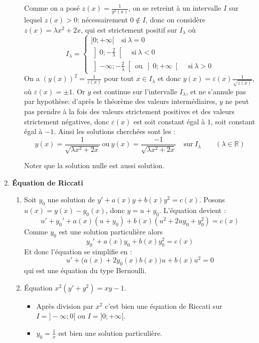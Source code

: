 \documentclass[11pt,a4paper]{article}
\newcommand{\Rr}{\mathbb{R}} \newcommand{\R}{\mathbb{R}}
\renewcommand{\epsilon}{\varepsilon}
\begin{document}
\begin{enumerate}
\begin{enumerate}
    Comme on a posé $z(x) = \frac{1}{y^2(x)}$, on se retreint à un intervalle $I$ sur lequel $z(x)>0$: nécessairement $0\notin I$, donc on considère $z(x)=\lambda x^2+2x$, qui est strictement positif sur $I_\lambda$ où
$$I_\lambda=\begin{cases}
]0;+\infty[\quad\text{si}\ \lambda=0\\
\left]0;-\frac{2}{\lambda}\right[\quad\text{si}\ \lambda<0\\
\left]-\infty;-\frac{2}{\lambda}\right[\ \mathrm{ou}\ \left]0;+\infty\right[\quad\text{si}\ \lambda>0              
            \end{cases}
$$
On a $(y(x))^2 = \frac{1}{z(x)}$ pour tout $x\in I_\lambda$ et donc  $y(x) = \epsilon(x)\frac{1}{\sqrt{z(x)}}$, 
où $\epsilon(x)=\pm 1$. Or $y$ est continue sur l'intervalle $I_\lambda$, et 
ne s'annule pas par hypothèse: d'après le théorème des valeurs intermédiaires, $y$ 
ne peut pas prendre à la fois des valeurs strictement positives et des valeurs 
strictement négatives, donc $\epsilon(x)$ est soit constant égal à $1$, soit constant égal à $-1$.
    Ainsi les solutions cherchées sont les :
    $$y(x) = \frac{1}{\sqrt{\lambda x^2 + 2x}}\ \mathrm{ou}\ y(x) = \frac{-1}{\sqrt{\lambda x^2 + 2x}}\quad\mathrm{sur}\ I_\lambda\qquad (\lambda\in \Rr)$$
    
    Noter que la solution nulle est aussi solution.
  \end{enumerate}
  \item \textbf{\'Equation de Riccati}
  \begin{enumerate}
    \item Soit $y_0$ une solution de $y'+ a(x)y +b(x)y^2 = c(x)$.
    Posons $u(x) = y(x)-y_0(x)$, donc $y = u +y_0$. L'équation devient :
    $$u'+y_0' + a(x) (u+y_0)  + b(x) (u^2+2uy_0 + y_0^2) = c(x)$$
    Comme $y_0$ est une solution particulière alors
    $$y_0'+ a(x)y_0 +b(x)y_0^2 = c(x)$$
    Et donc l'équation se simplifie en :
    $$u' + \big(a(x)+2y_0(x)b(x)\big) u + b(x) u^2 = 0$$
    qui est une équation du type Bernoulli.
    
    \item \'Equation $x^2(y'+y^2) = xy-1$.
    
    \begin{itemize}
      \item Après division par $x^2$ c'est bien une équation de Riccati sur $I=]-\infty;0[$ ou $I=]0;+\infty[$.
    
      \item $y_0 = \frac{1}{x}$ est bien une solution particulière.
      

\end{itemize}
\end{enumerate}
\end{enumerate}
\end{document}

